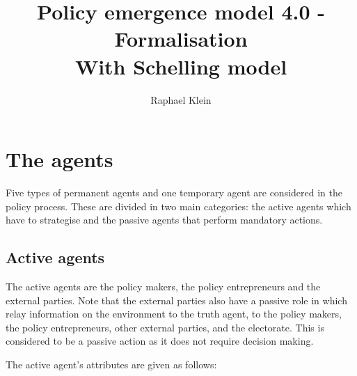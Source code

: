 \documentclass[11pt]{article}
\title{Policy emergence model 4.0 - Formalisation \\ With Schelling model}
\author{Raphael Klein}
\begin{document}
\maketitle



\tableofcontents


\section{The agents}
\label{sec:agents}

Five types of permanent agents and one temporary agent are considered in the policy process. These are divided in two main categories: the active agents which have to strategise and the passive agents  that perform mandatory actions.

\subsection{Active agents}
\label{ssec:activeAgents}

The active agents are the policy makers, the policy entrepreneurs and the external parties. Note that the external parties also have a passive role in which relay information on the environment to the truth agent, to the policy makers, the policy entrepreneurs, other external parties, and the electorate. This is considered to be a passive action as it does not require decision making.

The active agent's attributes are given as follows:
\end{document}
